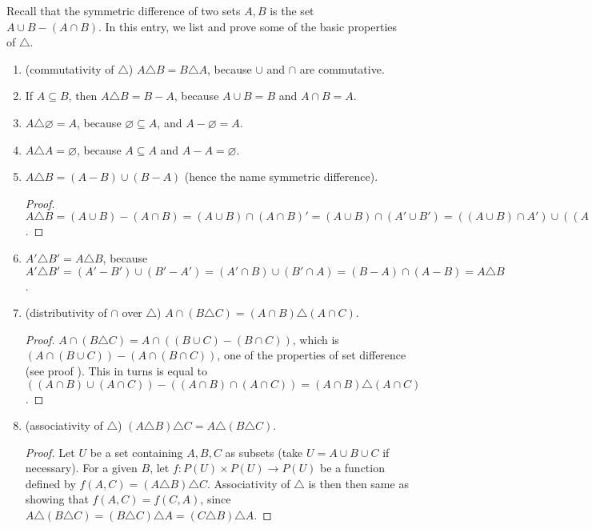 \documentclass[12pt]{article}
\newcommand{\<}{\langle}
\renewcommand{\>}{\rangle}
\newcommand{\symd}{\triangle}
\begin{document}
Recall that the symmetric difference of two sets $A,B$ is the set $A\cup B-(A\cap B)$.  In this entry, we list and prove some of the basic properties of $\symd$.

\begin{enumerate}
\item (commutativity of $\symd$) $A\symd B=B\symd A$, because $\cup$ and $\cap$ are commutative.
\item If $A\subseteq B$, then $A\symd B=B-A$, because $A\cup B= B$ and $A\cap B =A$.
\item $A\symd \varnothing = A$, because $\varnothing \subseteq A$, and $A-\varnothing=A$.
\item $A\symd A=\varnothing$, because $A\subseteq A$ and $A-A=\varnothing$.
\item $A\symd B=(A-B)\cup (B-A)$ (hence the name symmetric difference).
\begin{proof}
$A\symd B= (A\cup B)-(A\cap B)= (A\cup B)\cap (A\cap B)'= (A\cup B)\cap (A'\cup B')= ((A\cup B)\cap A')\cup ((A\cup B)\cap B')= (B\cap A')\cup (A\cap B')= (B-A)\cup (A-B)$.
\end{proof}
\item $A'\symd B'=A\symd B$, because $A'\symd B'=(A'-B')\cup (B'-A')=(A'\cap B)\cup (B'\cap A)=(B-A)\cap (A-B)=A\symd B$.
\item (distributivity of $\cap$ over $\symd$) $A\cap (B\symd C)=(A\cap B)\symd (A\cap C)$.
\begin{proof}
$A\cap (B\symd C) = A\cap ((B\cup C)-(B\cap C))$, which is $(A\cap (B\cup C))-(A\cap (B\cap C))$, one of the properties of set difference (see proof ).  This in turns is equal to $((A\cap B)\cup (A\cap C))-((A\cap B)\cap (A\cap C)) = (A\cap B)\symd (A\cap C)$.
\end{proof}
\item (associativity of $\symd$) $(A \symd B) \symd C = A \symd (B \symd C)$.
\begin{proof}
Let $U$ be a set containing $A,B,C$ as subsets (take $U=A\cup B\cup C$ if necessary).  For a given $B$, let $f:P(U)\times P(U)\to P(U)$ be a function defined by $f(A,C)= (A\symd B)\symd C$.  Associativity of $\symd$ is then then same as showing that $f(A,C)=f(C,A)$, since $A\symd (B\symd C)= (B\symd C)\symd A = (C\symd B)\symd A$.


\end{proof}
\end{enumerate}
\end{document}
